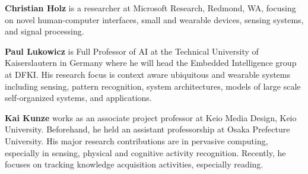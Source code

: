 \documentclass{sigchi-ext}
\begin{document}
{\bf Christian Holz} is a researcher at Microsoft Research, Redmond, WA, focusing on novel human-computer interfaces, small and wearable devices, sensing systems, and signal processing.

{\bf Paul Lukowicz} is Full Professor of AI at the Technical University of Kaiserslautern in Germany where he will head the Embedded Intelligence group at DFKI. His research focus is context aware ubiquitous and wearable systems including sensing, pattern recognition, system architectures, models of large scale self-organized systems, and applications.

{\bf Kai Kunze} works as an associate project professor at Keio Media Design, Keio University. Beforehand, he held an assistant professorship at Osaka Prefecture University.  His major research contributions are in pervasive computing, especially in sensing, physical and cognitive activity recognition. Recently, he focuses on tracking knowledge acquisition activities, especially reading.



\balance{} 



\end{document}
